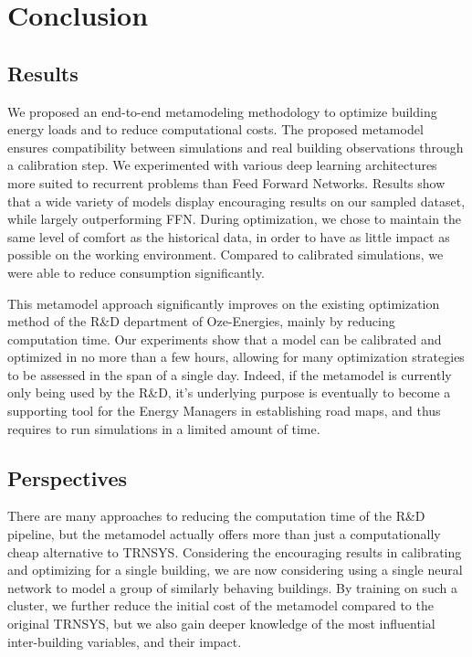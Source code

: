 \documentclass[12pt]{article}
\begin{document}
\section{Conclusion}
\subsection{Results}
We proposed an end-to-end metamodeling methodology to optimize building energy loads and to reduce computational costs. The proposed metamodel ensures compatibility between simulations and real building observations through a calibration step. We experimented with various deep learning architectures more suited to recurrent problems than Feed Forward Networks. Results show that a wide variety of models display encouraging results on our sampled dataset, while largely outperforming FFN. During optimization, we chose to maintain the same level of comfort as the historical data, in order to have as little impact as possible on the working environment. Compared to calibrated simulations, we were able to reduce consumption significantly.

This metamodel approach significantly improves on the existing optimization method of the R\&D department of Oze-Energies, mainly by reducing computation time. Our experiments show that a model can be calibrated and optimized in no more than a few hours, allowing for many optimization strategies to be assessed in the span of a single day. Indeed, if the metamodel is currently only being used by the R\&D, it's underlying purpose is eventually to become a supporting tool for the Energy Managers in establishing road maps, and thus requires to run simulations in a limited amount of time.

\subsection{Perspectives}
There are many approaches to reducing the computation time of the R\&D pipeline, but the metamodel actually offers more than just a computationally cheap alternative to TRNSYS. Considering the encouraging results in calibrating and optimizing for a single building, we are now considering using a single neural network to model a group of similarly behaving buildings. By training on such a cluster, we further reduce the initial cost of the metamodel compared to the original TRNSYS, but we also gain deeper knowledge of the most influential inter-building variables, and their impact.
\end{document}
